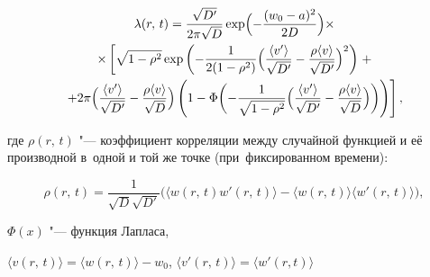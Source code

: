 \begin{multline}

\label{kovPop:eq6} 

\lambda (r,\,t) = \frac{\sqrt {D'} }{2\pi \sqrt D }\exp \Bigl(  - \frac{(w_0 - a)^2}{2D} \Bigr)\times

\\

\times 

\left[ 

\sqrt {1 - \rho ^2} 

\exp \left(  

- \frac{1}{2(1 - \rho ^2)} 

\Bigl( 

\frac{\langle v'\rangle }{\sqrt {D'}}  - \frac{\rho \langle v\rangle }{\sqrt {D'}} 

\Bigr)^2 

\right)

\right. +

\\

\left.  

+ 2\pi \Bigl( \frac{\langle v'\rangle }{\sqrt {D'} } - \frac{\rho \langle v\rangle }{\sqrt D } \Bigr)

 \left( 1 - \Phi \biggl(

   - \frac{1}{\sqrt {1 - \rho ^2} }

\Bigl( 

\frac{\langle v'\rangle }{\sqrt {D'}}  - \frac{\rho \langle v\rangle }{\sqrt D } 

\Bigr) 

\biggr) \right) \right],

\end{multline}

где $\rho (r,\,t)$ "--- коэффициент корреляции между случайной функцией и её производной в~одной и той же точке (при~фиксированном времени):

\begin{equation}

\label{kovPop:eq7}\rho (r,\,t) = \frac1{\sqrt D \sqrt {D'} } \bigl({\langle w(r,\,t){w}'(r,\,t)\rangle - \langle

w(r,\,t)\rangle \langle {w}'(r,\,t)\rangle }\bigr),

\end{equation}

$\Phi (x)$ "--- функция Лапласа,

$\langle v(r,\,t)\rangle = \langle w(r,\,t)\rangle - w_0$, $\langle {v}'(r,\,t)\rangle = \langle {w}'(r,t)\rangle$ 

